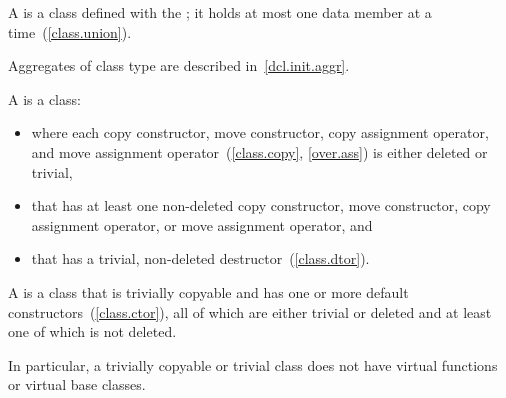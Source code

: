\pnum
{}%
%
%
A  is a class defined with the 
;
%
it holds at most one data member at a time~(\ref{class.union}).
\begin{note}
Aggregates of class type are described in~\ref{dcl.init.aggr}.
\end{note}

%
%
%
\pnum
A  is a class:

\begin{itemize}
\item where each copy constructor, move constructor, copy assignment operator,
and move assignment operator~(\ref{class.copy}, \ref{over.ass})
is either deleted or trivial,
\item that has at least one non-deleted copy constructor, move constructor,
copy assignment operator, or move assignment operator, and
\item that has a trivial, non-deleted destructor~(\ref{class.dtor}).
\end{itemize}

A  is a class that is trivially copyable and
has one or more default constructors~(\ref{class.ctor}),
all of which are either trivial or deleted and
at least one of which is not deleted.
\begin{note} In particular, a trivially copyable or trivial class does not have
virtual functions or virtual base classes.\end{note}

